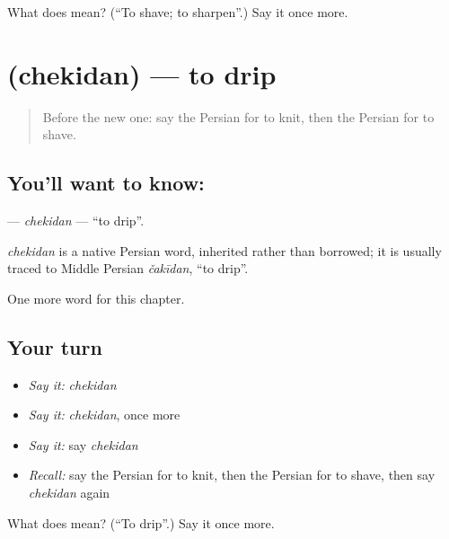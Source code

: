 \begin{tcolorbox}[breakable,colback=teal!4,colframe=teal!35!black,title={Before you move on}]
What does  mean? (\textquotedblleft{}To shave; to sharpen\textquotedblright{}.) Say it once more.
\end{tcolorbox}
\section[\texorpdfstring{\fa{چکیدن} (chekidan)}{چکیدن (chekidan)}]{ (chekidan) — to drip}

\label{lesson:FA-C186-chekidan}



\begin{quote}
Before the new one: say the Persian for to knit, then the Persian for to shave.
\end{quote}

\subsection*{You'll want to know: }
\textbf{} — \emph{chekidan} — \textquotedblleft{}to drip\textquotedblright{}.

\begin{cousinweb}
\emph{chekidan} is a native Persian word, inherited rather than borrowed; it is usually traced to Middle Persian \emph{čakīdan}, \textquotedblleft{}to drip\textquotedblright{}.
\end{cousinweb}

\begin{grammarlens}[title={What you've built}]
One more word for this chapter.
\end{grammarlens}

\subsection*{Your turn}
\begin{itemize}
\raggedright
  \item \emph{Say it:} \emph{chekidan}
  \item \emph{Say it:} \emph{chekidan}, once more
  \item \emph{Say it:} say \emph{chekidan}
  \item \emph{Recall:} say the Persian for to knit, then the Persian for to shave, then say \emph{chekidan} again
\end{itemize}

\begin{tcolorbox}[breakable,colback=teal!4,colframe=teal!35!black,title={Before you move on}]
What does  mean? (\textquotedblleft{}To drip\textquotedblright{}.) Say it once more.
\end{tcolorbox}
